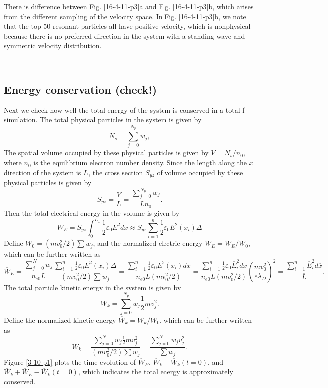 \documentclass{article}
\begin{document}
There is difference between Fig. \ref{16-4-11-p3}a and Fig. \ref{16-4-11-p3}b,
which arises from the different sampling of the velocity space. In Fig.
\ref{16-4-11-p3}b, we note that the top 50 resonant particles all have
positive velocity, which is nonphysical because there is no preferred
direction in the system with a standing wave and symmetric velocity
distribution.

\

\subsection{Energy conservation (check!)}

Next we check how well the total energy of the system is conserved in a
total-f simulation. The total physical particles in the system is given by
\begin{equation}
  N_s = \sum_{j = 0}^{N_p} w_j,
\end{equation}
The spatial volume occupied by these physical particles is given by $V = N_s /
n_0$, where $n_0$ is the equilibrium electron number density. Since the length
along the $x$ direction of the system is $L_{}$, the cross section $S_{y z}$
of volume occupied by these physical particles is given by
\begin{equation}
  S_{y z} = \frac{V}{L} = \frac{\sum_{j = 0}^{N_p} w_j}{L n_0} .
\end{equation}
Then the total electrical energy in the volume is given by
\begin{equation}
  W_E = S_{y z} \int_0^{L_x} \frac{1}{2} \varepsilon_0 E^2 d x \approx S_{y z}
  \sum_{i = 1}^n \frac{1}{2} \varepsilon_0 E^2 (x_i) \Delta
\end{equation}
Define $W_0 = (m v_0^2 / 2) \sum w_j$, and the normalized electric energy
$\overline{W}_E = W_E / W_0$, which can be further written as
\begin{equation}
  \overline{W}_E = \frac{\sum_{j = 0}^N w_j}{n_{e 0} L}  \frac{\sum_{i = 1}^n
  \frac{1}{2} \varepsilon_0 E^2 (x_i) \Delta}{(m v_0^2 / 2) \sum w_j} =
  \frac{\sum_{i = 1}^n \frac{1}{2} \varepsilon_0 E^2 (x_i) d x}{n_{e 0} L (m
  v_0^2 / 2)} = \frac{\sum_{i = 1}^n \frac{1}{2} \varepsilon_0
  \overline{E}_i^2 d x}{n_{e 0} L (m v_0^2 / 2)} \left( \frac{m v_0^2}{e
  \lambda_D} \right)^2 = \frac{\sum_{i = 1}^n \overline{E}_i^2 d
  \overline{x}}{\overline{L}} .
\end{equation}
The total particle kinetic energy in the system is given by
\begin{equation}
  W_k = \sum_{j = 0}^{N_p} w_j \frac{1}{2} m v^2_j .
\end{equation}
Define the normalized kinetic energy $\overline{W}_k = W_k / W_0$, which can
be further written as
\begin{equation}
  \overline{W}_k = \frac{\sum_{j = 0}^N w_j \frac{1}{2} m v^2_j}{(m v_0^2 / 2)
  \sum w_j} = \frac{\sum_{j = 0}^N w_j \overline{v}_j^2}{\sum w_j} .
\end{equation}
Figure \ref{3-10-p1} plots the time evolution of $\overline{W}_E$,
$\overline{W}_k - \overline{W}_k (t = 0)$, and $\overline{W}_k +
\overline{W}_E - \overline{W}_k (t = 0)$, which indicates the total energy is
approximately conserved.
\end{document}
